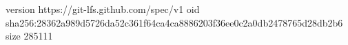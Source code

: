 version https://git-lfs.github.com/spec/v1
oid sha256:28362a989d5726da52c361f64ca4ca8886203f36ee0c2a0db2478765d28db2b6
size 285111

